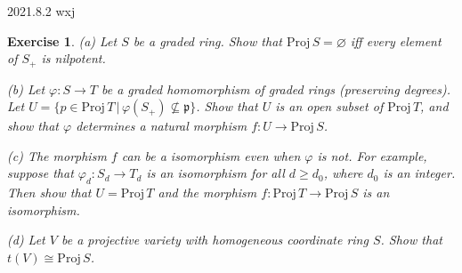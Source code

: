 \documentclass[12pt]{amsart}
\newtheorem{exe}{Exercise}[subsection]
\begin{document}
2021.8.2 wxj

\begin{exe}
	\label{2.2.14}
   (a) Let $S$ be a graded ring. Show that $\mathrm{Proj}\, S = \varnothing$ iff every element of $S_{+}$ is nilpotent.
   
   (b) Let $\varphi  : S \to T$ be a graded homomorphism of graded rings (preserving degrees). Let $U = \{ p \in \mathrm{Proj}\, T\, |\, \varphi(S_{+}) \not\subseteq \mathfrak{p} \}$. Show that $U$ is an open subset of $\mathrm{Proj}\, T$, and show that $\varphi$ determines a natural morphism $f : U \to \mathrm{Proj}\, S$.
   
   (c) The morphism $f$ can be a isomorphism even when $\varphi$ is not. For example, suppose that $\varphi_{d} : S_{d} \to T_{d}$ is an isomorphism for all $d \geq d_{0}$, where $d_{0}$ is an integer. Then show that $U = \mathrm{Proj}\, T$ and the morphism $f : \mathrm{Proj}\, T \to \mathrm{Proj}\, S$ is an isomorphism.
   
   (d) Let $V$ be a projective variety with homogeneous coordinate ring $S$. Show that $t(V) \cong \mathrm{Proj}\, S$.
\end{exe}
\end{document}
